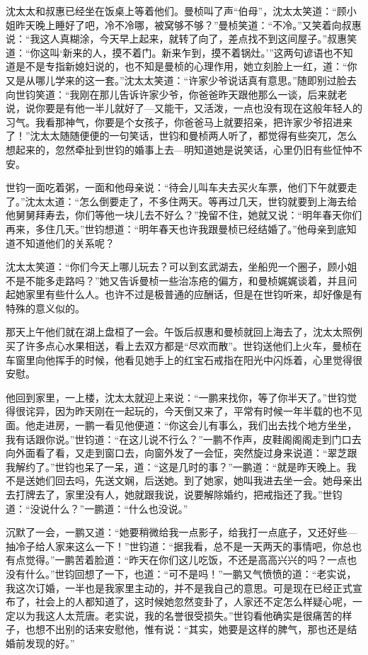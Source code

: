 \par 沈太太和叔惠已经坐在饭桌上等着他们。曼桢叫了声“伯母”，沈太太笑道：“顾小姐昨天晚上睡好了吧，冷不冷哪，被窝够不够？”曼桢笑道：“不冷。”又笑着向叔惠说：“我这人真糊涂，今天早上起来，就转了向了，差点找不到这间屋子。”叔惠笑道：“你这叫‘新来的人，摸不着门。新来乍到，摸不着锅灶。’”这两句谚语也不知道是不是专指新媳妇说的，也不知是曼桢的心理作用，她立刻脸上一红，道：“你又是从哪儿学来的这一套。”沈太太笑道：“许家少爷说话真有意思。”随即别过脸去向世钧笑道：“我刚在那儿告诉许家少爷，你爸爸昨天跟他那么一谈，后来就老说，说你要是有他一半儿就好了—又能干，又活泼，一点也没有现在这般年轻人的习气。我看那神气，你要是个女孩子，你爸爸马上就要招亲，把许家少爷招进来了！”沈太太随随便便的一句笑话，世钧和曼桢两人听了，都觉得有些突兀，怎么想起来的，忽然牵扯到世钧的婚事上去—明知道她是说笑话，心里仍旧有些怔忡不安。
\par 世钧一面吃着粥，一面和他母亲说：“待会儿叫车夫去买火车票，他们下午就要走了。”沈太太道：“怎么倒要走了，不多住两天。等再过几天，世钧就要到上海去给他舅舅拜寿去，你们等他一块儿去不好么？”挽留不住，她就又说：“明年春天你们再来，多住几天。”世钧想道：“明年春天也许我跟曼桢已经结婚了。”他母亲到底知道不知道他们的关系呢？
\par 沈太太笑道：“你们今天上哪儿玩去？可以到玄武湖去，坐船兜一个圈子，顾小姐不是不能多走路吗？”她又告诉曼桢一些治冻疮的偏方，和曼桢娓娓谈着，并且问起她家里有些什么人。也许不过是极普通的应酬话，但是在世钧听来，却好像是有特殊的意义似的。
\par 那天上午他们就在湖上盘桓了一会。午饭后叔惠和曼桢就回上海去了，沈太太照例买了许多点心水果相送，看上去双方都是“尽欢而散”。世钧送他们上火车，曼桢在车窗里向他挥手的时候，他看见她手上的红宝石戒指在阳光中闪烁着，心里觉得很安慰。
\par 他回到家里，一上楼，沈太太就迎上来说：“一鹏来找你，等了你半天了。”世钧觉得很诧异，因为昨天刚在一起玩的，今天倒又来了，平常有时候一年半载的也不见面。他走进房，一鹏一看见他便道：“你这会儿有事么，我们出去找个地方坐坐，我有话跟你说。”世钧道：“在这儿说不行么？”一鹏不作声，皮鞋阁阁阁走到门口去向外面看了看，又走到窗口去，向窗外发了一会怔，突然旋过身来说道：“翠芝跟我解约了。”世钧也呆了一呆，道：“这是几时的事？”一鹏道：“就是昨天晚上。我不是送她们回去吗，先送文娴，后送她。到了她家，她叫我进去坐一会。她母亲出去打牌去了，家里没有人，她就跟我说，说要解除婚约，把戒指还了我。”世钧道：“没说什么？”一鹏道：“什么也没说。”
\par 沉默了一会，一鹏又道：“她要稍微给我一点影子，给我打一点底子，又还好些—抽冷子给人家来这么一下！”世钧道：“据我看，总不是一天两天的事情吧，你总也有点觉得。”一鹏苦着脸道：“昨天在你们这儿吃饭，不还是高高兴兴的吗？一点也没有什么。”世钧回想了一下，也道：“可不是吗！”一鹏又气愤愤的道：“老实说，我这次订婚，一半也是我家里主动的，并不是我自己的意思。可是现在已经正式宣布了，社会上的人都知道了，这时候她忽然变卦了，人家还不定怎么样疑心呢，一定以为我这人太荒唐。老实说，我的名誉很受损失。”世钧看他确实是很痛苦的样子，也想不出别的话来安慰他，惟有说：“其实，她要是这样的脾气，那也还是结婚前发现的好。”
